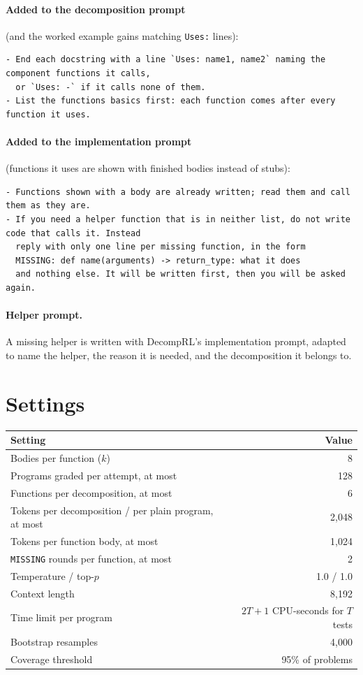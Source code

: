 \documentclass[11pt]{article}
\begin{document}
\paragraph{Added to the decomposition prompt} (and the worked example gains matching \texttt{Uses:} lines):
\begin{lstlisting}
- End each docstring with a line `Uses: name1, name2` naming the component functions it calls,
  or `Uses: -` if it calls none of them.
- List the functions basics first: each function comes after every function it uses.
\end{lstlisting}

\paragraph{Added to the implementation prompt} (functions it uses are shown with finished bodies instead of stubs):
\begin{lstlisting}
- Functions shown with a body are already written; read them and call them as they are.
- If you need a helper function that is in neither list, do not write code that calls it. Instead
  reply with only one line per missing function, in the form
  MISSING: def name(arguments) -> return_type: what it does
  and nothing else. It will be written first, then you will be asked again.
\end{lstlisting}

\paragraph{Helper prompt.} A missing helper is written with DecompRL's implementation prompt, adapted to name the
helper, the reason it is needed, and the decomposition it belongs to.

\section{Settings}
\label{app:settings}

\begin{center}
\begin{tabular}{lr}
\toprule
Setting & Value \\
\midrule
Bodies per function ($k$) & 8 \\
Programs graded per attempt, at most & 128 \\
Functions per decomposition, at most & 6 \\
Tokens per decomposition / per plain program, at most & 2,048 \\
Tokens per function body, at most & 1,024 \\
\texttt{MISSING} rounds per function, at most & 2 \\
Temperature / top-$p$ & 1.0 / 1.0 \\
Context length & 8,192 \\
Time limit per program & $2T+1$ CPU-seconds for $T$ tests \\
Bootstrap resamples & 4,000 \\
Coverage threshold & 95\% of problems \\
\bottomrule
\end{tabular}
\end{center}
\end{document}
